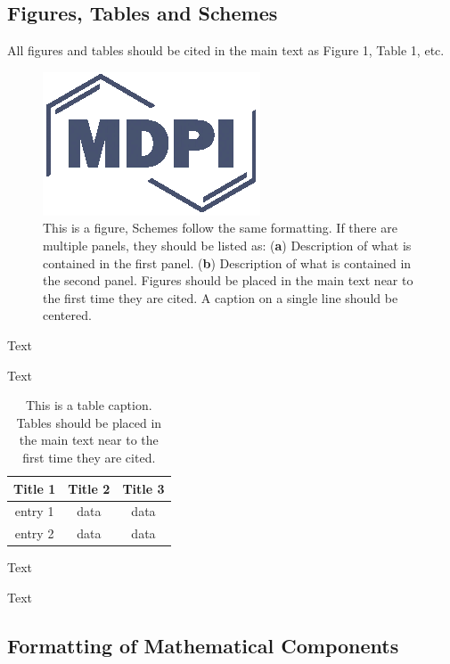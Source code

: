 \documentclass[hydrology,article,submit,moreauthors,pdftex]{Definitions/mdpi}
\begin{document}
\subsection{Figures, Tables and Schemes}

All figures and tables should be cited in the main text as Figure 1, Table 1, etc.

\begin{figure}[H]
\centering
\includegraphics[width=2 cm]{Definitions/logo-mdpi}
\caption{This is a figure, Schemes follow the same formatting. If there are multiple panels, they should be listed as: (\textbf{a}) Description of what is contained in the first panel. (\textbf{b}) Description of what is contained in the second panel. Figures should be placed in the main text near to the first time they are cited. A caption on a single line should be centered.}
\end{figure}   
 
Text

Text

\begin{table}[H]
\caption{This is a table caption. Tables should be placed in the main text near to the first time they are cited.}
\centering
\begin{tabular}{ccc}
\toprule
\textbf{Title 1}	& \textbf{Title 2}	& \textbf{Title 3}\\
\midrule
entry 1		& data			& data\\
entry 2		& data			& data\\
\bottomrule
\end{tabular}
\end{table}

Text

Text



\subsection{Formatting of Mathematical Components}
\end{document}
